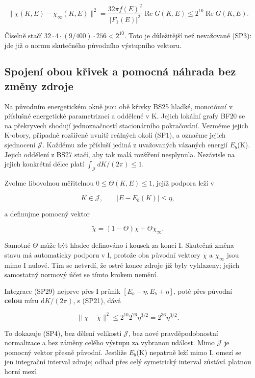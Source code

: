 \documentclass[11pt,a4paper]{article}
\theoremstyle{remark}\newtheorem{remark}[theorem]{Poznámka}
\numberwithin{equation}{section}
\begin{document}
\[
\boxed{
\|\chi(K,E)-\chi_\infty(K,E)\|^2
=\frac{32\pi f(E)^2}{|F_1(E)|^2}
\operatorname{Re}G(K,E)
\le2^{10}\operatorname{Re}G(K,E).}
\tag{SP29}
\]

Číselně stačí \(32\cdot4\cdot(9/400)\cdot256<2^{10}\). Toto je
důležitější než nevažované (SP3): jde již o normu skutečného původního
výstupního vektoru.

\hypertarget{spojenuxed-obou-kux159ivek-a-pomocnuxe1-nuxe1hrada-bez-zmux11bny-zdroje}{%
\subsection{Spojení obou křivek a pomocná náhrada bez změny
zdroje}\label{spojenuxed-obou-kux159ivek-a-pomocnuxe1-nuxe1hrada-bez-zmux11bny-zdroje}}

Na původním energetickém okně jsou obě křivky BS25 hladké, monotónní v
příslušné energetické parametrizaci a oddělené v K. Jejich lokální grafy
BF20 se na překryvech shodují jednoznačností stacionárního pokračování.
Vezměme jejich K-obory, případně rozšířené uvnitř reálných okolí (SP1),
a označme jejich sjednocení \(\mathcal J\). Každému zde přísluší jediná
z uvažovaných vázaných energií \(E_b\)(K). Jejich oddělení z BS27 stačí,
aby tak malá rozšíření nesplynula. Nezávisle na jejich konkrétní délce
platí \(\int_\mathcal J dK/(2\pi)\le1\).

Zvolme libovolnou měřitelnou \(0\le\Theta(K,E)\le1\), jejíž podpora leží
v

\[
K\in\mathcal J,\qquad |E-E_b(K)|\le\eta,
\]

a definujme pomocný vektor

\[
\widetilde\chi=(1-\Theta)\chi+\Theta\chi_\infty.
\tag{SP30}
\]

Samotné \(\Theta\) může být hladce definováno i kousek za konci I.
Skutečná změna stavu má automaticky podporu v I, protože oba původní
vektory \(\chi\) a \(\chi_\infty\) jsou mimo I nulové. Tím se netvrdí,
že ostré konce zdroje již byly vyhlazeny; jejich samostatný normový účet
se tímto krokem nemění.

Integrace (SP29) nejprve přes I průnik \([E_b-\eta,E_b+\eta]\), poté
přes původní \textbf{celou} míru \(\mathrm dK/(2\pi)\), s (SP21), dává

\[
\|\chi-\widetilde\chi\|^2
\le2^{10}2^{26}\eta^{3/2}=2^{36}\eta^{3/2}.
\tag{SP31}
\]

To dokazuje (SP4), bez dělení velikostí \(\mathcal J\), bez nové
pravděpodobnostní normalizace a bez záměny celého výstupu za vybranou
událost. Mimo \(\mathcal J\) je pomocný vektor přesně původní. Jestliže
\(E_b\)(K) nepatrně leží mimo I, omezí se jen integrační interval
zdroje; odhad přes celý symetrický interval zůstává platnou horní mezí.
\end{document}
